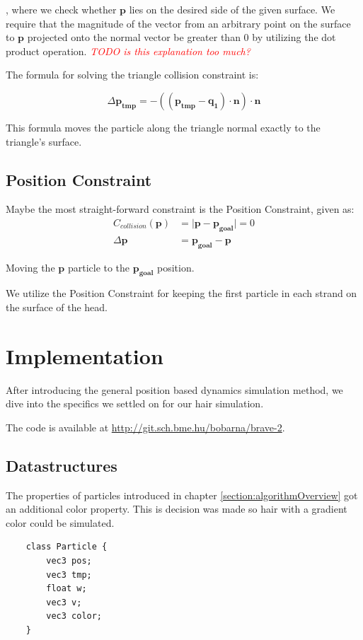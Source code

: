 \documentclass[sigplan,screen,nonacm]{acmart}
\newcommand\TODO[1]{\textcolor{red}{\emph{TODO #1}}}
\renewcommand{\b}{\boldsymbol}
\begin{document}
, where we check whether $\b{p}$ lies on the desired side of the given
surface. We require that the magnitude of the vector from an arbitrary point
on the surface to $\b{p}$ projected onto the normal vector be greater than 0 by
utilizing the dot product operation.
\TODO{is this explanation too much?}

The formula for solving the triangle collision constraint is:

$$
\Delta \b{p_{tmp}} = -((\b{p_{tmp}}-\b{q_1})\cdot \b{n})\cdot \b{n}
$$

This formula moves the particle along the triangle normal exactly to the
triangle's surface. 

\subsection{Position Constraint}
Maybe the most straight-forward constraint is the Position Constraint, given as:
\begin{align*}
    C_{collision}(\b{p}) &= \lvert \b{p} - \b{p_{goal}} \rvert = 0
    \\
    \Delta \b{p} &= \b{p_{goal}} - \b{p}
\end{align*}

Moving the $\b{p}$ particle to the $\b{p_{goal}}$ position.

We utilize the Position Constraint for keeping the first particle in each strand
on the surface of the head.


\section{Implementation}
After introducing the general position based dynamics simulation method, we dive
into the specifics we settled on for our hair simulation.

The code is available at \url{http://git.sch.bme.hu/bobarna/brave-2}.

\subsection{Datastructures}

The properties of particles introduced in chapter
\ref{section:algorithmOverview}
 got an additional color property. This is
decision was made so hair with a gradient color could be simulated.

\begin{verbatim}
    class Particle {
        vec3 pos;
        vec3 tmp;
        float w;
        vec3 v;
        vec3 color;
    }
\end{verbatim}
\end{document}
